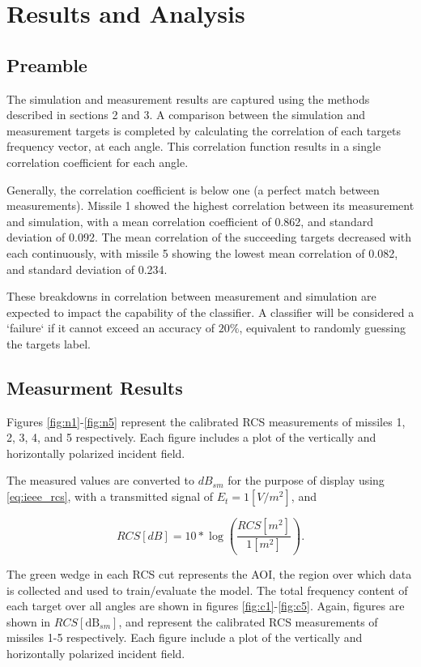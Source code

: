 \chapter{Results and Analysis}
\label{ch:results}
\glsresetall
\section{Preamble}

The simulation and measurement results are captured using the methods described in sections 2 and 3. A comparison between the simulation and measurement targets is completed by calculating the correlation of each targets frequency vector, at each angle. This correlation function results in a single correlation coefficient for each angle.

Generally, the correlation coefficient is below one (a perfect match between measurements). Missile 1 showed the highest correlation between its measurement and simulation, with a mean correlation coefficient of 0.862, and standard deviation of 0.092. The mean correlation of the succeeding targets decreased with each continuously, with missile 5 showing the lowest mean correlation of 0.082, and standard deviation of 0.234.

These breakdowns in correlation between measurement and simulation are expected to impact the capability of the classifier. A classifier will be considered a `failure` if it cannot exceed an accuracy of $20\%$, equivalent to randomly guessing the targets label.

\section{Measurment Results}
\label{sec:meas_res}

	Figures \ref{fig:n1}-\ref{fig:n5} represent the calibrated RCS measurements of missiles 1, 2, 3, 4, and 5 respectively. Each figure includes a plot of the vertically and horizontally polarized incident field.

	The measured values are converted to $dB_{sm}$ for the purpose of display using \ref{eq:ieee_rcs}, with a transmitted signal of $E_t = 1 [V/m^2]$, and

	\begin{equation}\label{eq:rcs_db}
		RCS [dB] = 10 * \log \left( \frac{RCS [m^2]}{1 [m^2]}\right).
	\end{equation}

	The green wedge in each RCS cut represents the \gls{AOI}, the region over which data is collected and used to train/evaluate the model. The total frequency content of each target over all angles are shown in figures \ref{fig:c1}-\ref{fig:c5}. Again, figures are shown in $RCS [\textrm{dB}_{sm}]$, and represent the calibrated RCS measurements of missiles 1-5 respectively. Each figure include a plot of the vertically and horizontally polarized incident field.

